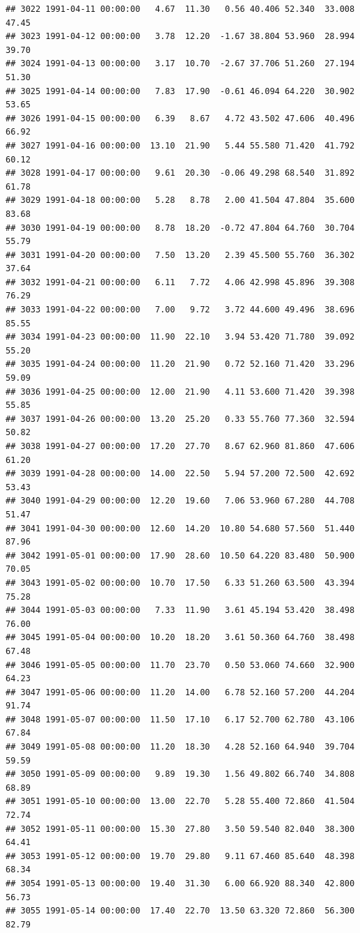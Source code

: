 \documentclass{article}\usepackage{graphicx, color}
\makeatletter
\newenvironment{kframe}{%
 \def\at@end@of@kframe{}%
 \ifinner\ifhmode%
  \def\at@end@of@kframe{\end{minipage}}%
  \begin{minipage}{\columnwidth}%
 \fi\fi%
 \def\FrameCommand##1{\hskip\@totalleftmargin \hskip-\fboxsep
 \colorbox{shadecolor}{##1}\hskip-\fboxsep
     \hskip-\linewidth \hskip-\@totalleftmargin \hskip\columnwidth}%
 \MakeFramed {\advance\hsize-\width
   \@totalleftmargin\z@ \linewidth\hsize
   \@setminipage}}%
 {\par\unskip\endMakeFramed%
 \at@end@of@kframe}
\newenvironment{knitrout}{}{} %
\makeatother
\begin{document}
\begin{knitrout}
\begin{kframe}
\begin{verbatim}
## 3022 1991-04-11 00:00:00   4.67  11.30   0.56 40.406 52.340  33.008  47.45
## 3023 1991-04-12 00:00:00   3.78  12.20  -1.67 38.804 53.960  28.994  39.70
## 3024 1991-04-13 00:00:00   3.17  10.70  -2.67 37.706 51.260  27.194  51.30
## 3025 1991-04-14 00:00:00   7.83  17.90  -0.61 46.094 64.220  30.902  53.65
## 3026 1991-04-15 00:00:00   6.39   8.67   4.72 43.502 47.606  40.496  66.92
## 3027 1991-04-16 00:00:00  13.10  21.90   5.44 55.580 71.420  41.792  60.12
## 3028 1991-04-17 00:00:00   9.61  20.30  -0.06 49.298 68.540  31.892  61.78
## 3029 1991-04-18 00:00:00   5.28   8.78   2.00 41.504 47.804  35.600  83.68
## 3030 1991-04-19 00:00:00   8.78  18.20  -0.72 47.804 64.760  30.704  55.79
## 3031 1991-04-20 00:00:00   7.50  13.20   2.39 45.500 55.760  36.302  37.64
## 3032 1991-04-21 00:00:00   6.11   7.72   4.06 42.998 45.896  39.308  76.29
## 3033 1991-04-22 00:00:00   7.00   9.72   3.72 44.600 49.496  38.696  85.55
## 3034 1991-04-23 00:00:00  11.90  22.10   3.94 53.420 71.780  39.092  55.20
## 3035 1991-04-24 00:00:00  11.20  21.90   0.72 52.160 71.420  33.296  59.09
## 3036 1991-04-25 00:00:00  12.00  21.90   4.11 53.600 71.420  39.398  55.85
## 3037 1991-04-26 00:00:00  13.20  25.20   0.33 55.760 77.360  32.594  50.82
## 3038 1991-04-27 00:00:00  17.20  27.70   8.67 62.960 81.860  47.606  61.20
## 3039 1991-04-28 00:00:00  14.00  22.50   5.94 57.200 72.500  42.692  53.43
## 3040 1991-04-29 00:00:00  12.20  19.60   7.06 53.960 67.280  44.708  51.47
## 3041 1991-04-30 00:00:00  12.60  14.20  10.80 54.680 57.560  51.440  87.96
## 3042 1991-05-01 00:00:00  17.90  28.60  10.50 64.220 83.480  50.900  70.05
## 3043 1991-05-02 00:00:00  10.70  17.50   6.33 51.260 63.500  43.394  75.28
## 3044 1991-05-03 00:00:00   7.33  11.90   3.61 45.194 53.420  38.498  76.00
## 3045 1991-05-04 00:00:00  10.20  18.20   3.61 50.360 64.760  38.498  67.48
## 3046 1991-05-05 00:00:00  11.70  23.70   0.50 53.060 74.660  32.900  64.23
## 3047 1991-05-06 00:00:00  11.20  14.00   6.78 52.160 57.200  44.204  91.74
## 3048 1991-05-07 00:00:00  11.50  17.10   6.17 52.700 62.780  43.106  67.84
## 3049 1991-05-08 00:00:00  11.20  18.30   4.28 52.160 64.940  39.704  59.59
## 3050 1991-05-09 00:00:00   9.89  19.30   1.56 49.802 66.740  34.808  68.89
## 3051 1991-05-10 00:00:00  13.00  22.70   5.28 55.400 72.860  41.504  72.74
## 3052 1991-05-11 00:00:00  15.30  27.80   3.50 59.540 82.040  38.300  64.41
## 3053 1991-05-12 00:00:00  19.70  29.80   9.11 67.460 85.640  48.398  68.34
## 3054 1991-05-13 00:00:00  19.40  31.30   6.00 66.920 88.340  42.800  56.73
## 3055 1991-05-14 00:00:00  17.40  22.70  13.50 63.320 72.860  56.300  82.79

\end{verbatim}
\end{kframe}
\end{knitrout}
\end{document}
